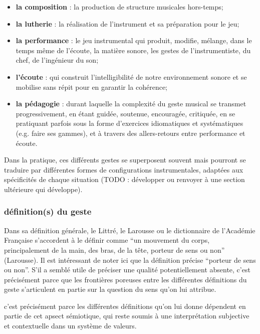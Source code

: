 \vspace{-1em}
\begin{itemize}[noitemsep]
\item \textbf{la composition} : la production de structure musicales hors-temps;
\item \textbf{la lutherie} : la réalisation de l'instrument et sa préparation pour le jeu;
\item \textbf{la performance} : le jeu instrumental qui produit, modifie, mélange, dans le temps même de l'écoute, la matière sonore, les gestes de l'instrumentiste, du chef, de l'ingénieur du son;
\item \textbf{l'écoute} : qui construit l'intelligibilité de notre environnement sonore et se mobilise sans répit pour en garantir la cohérence;
\item \textbf{la pédagogie} : durant laquelle la complexité du geste musical se transmet progressivement, en étant guidée, soutenue, encouragée, critiquée, en se pratiquant parfois sous la forme d'exercices idiomatiques et systématiques (e.g. faire ses gammes), et à travers des allers-retours entre performance et écoute.
\end{itemize}

\noindent Dans la pratique, ces différents gestes se superposent souvent mais pourront se traduire par différentes formes de configurations instrumentales, adaptées aux spécificités de chaque situation (TODO : développer ou renvoyer à une section ultérieure qui développe).

\subsubsection{définition(s) du geste}
Dans sa définition générale, le Littré, le Larousse ou le dictionnaire de l'Académie Française s'accordent à le définir comme ``un mouvement du corps, principalement de la main, des bras, de la tête, porteur de sens ou non'' (Larousse). Il est intéressant de noter ici que la définition précise ``porteur de sens ou non''. S'il a semblé utile de préciser une qualité potentiellement absente, c'est précisément parce que les frontières poreuses entre les différentes définitions du geste s'articulent en partie sur la question du sens qu'on lui attribue.

 c'est précisément parce les différentes définitions qu'on lui donne dépendent en partie de cet apsect sémiotique, qui reste soumis à une interprétation subjective et contextuelle dans un système de valeurs.


